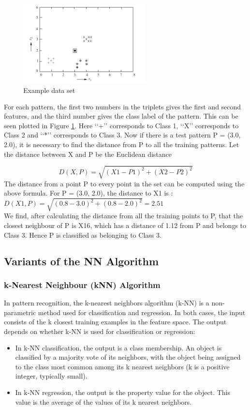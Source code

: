 \begin{figure}[H]
\centering
\includegraphics[width=0.6\textwidth]{img/nn-example.PNG}
\caption{ Example data set }
\label{fig:NN}
\end{figure}

For each pattern, the first two numbers in the triplets gives the first and second
features, and the third number gives the class label of the pattern.
This can be seen plotted in Figure \ref{fig:NN}. Here ‘‘+’’ corresponds to Class 1, ‘‘X’’
corresponds to Class 2 and ‘‘*’’ corresponds to Class 3.
Now if there is a test pattern P = (3.0, 2.0), it is necessary to find the distance
from P to all the training patterns.
Let the distance between X and P be the Euclidean distance

$$D(X,P) = \sqrt{(X1 - P1)^{2} + (X2 - P2 )^{2} }$$
\newline
The distance from a point P to every point in the set can be computed using the above formula. For P = (3.0, 2.0), the distance to X1 is :
$D(X1,P) = \sqrt{(0.8 - 3.0)^{2} + (0.8 - 2.0 )^{2} } = 2.51 $ \\
We find, after calculating the distance from all the training points to P, that the closest
neighbour of P is X16, which has a distance of 1.12 from P and belongs to Class 3.
Hence P is classified as belonging to Class 3.
\subsection{Variants of the NN Algorithm}
\subsubsection{k-Nearest Neighbour (kNN) Algorithm}
In pattern recognition, the k-nearest neighbors algorithm (k-NN) is a non-parametric method used for classification and regression.  In both cases, the input consists of the k closest training examples in the feature space. The output depends on whether k-NN is used for classification or regression:
\begin{itemize}
\item In k-NN classification, the output is a class membership. An object is classified by a majority vote of its neighbors, with the object being assigned to the class most common among its k nearest neighbors (k is a positive integer, typically small). 
\item In k-NN regression, the output is the property value for the object. This value is the average of the values of its k nearest neighbors.
\end{itemize}

